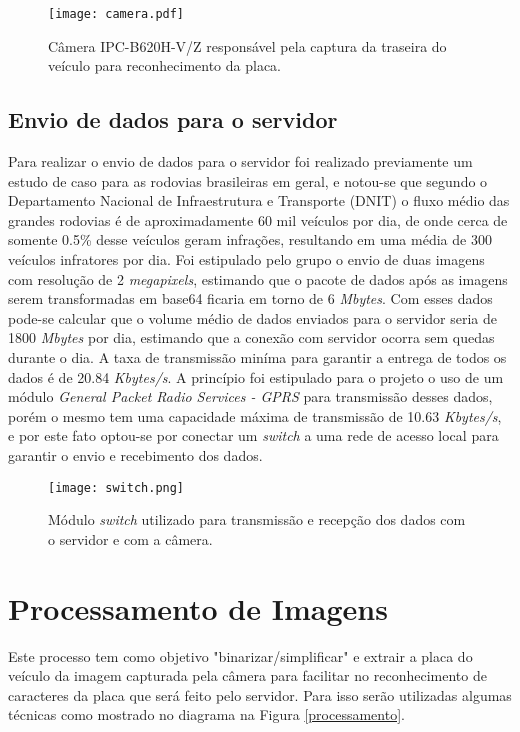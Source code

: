    \begin{figure}[H]
    \centering
    \texttt{[image: camera.pdf]}
    \caption{Câmera IPC-B620H-V/Z responsável pela captura da traseira do veículo para reconhecimento da placa.}
    \label{camera}
\end{figure}

    
    \subsection{Envio de dados para o servidor}
    Para realizar o envio de dados para o servidor foi realizado previamente um estudo de caso para as rodovias brasileiras em geral, e notou-se que segundo o Departamento Nacional de Infraestrutura e Transporte (DNIT) o fluxo médio das grandes rodovias é de aproximadamente 60 mil veículos por dia, de onde cerca de somente 0.5\% desse veículos geram infrações, resultando em uma média de 300 veículos infratores por dia. Foi estipulado pelo grupo o envio de duas imagens com resolução de 2 \emph{megapixels}, estimando que o pacote de dados após as imagens serem transformadas em base64 ficaria em torno de 6 \emph{Mbytes}. Com esses dados pode-se calcular que o volume médio de dados enviados para o servidor seria de 1800 \emph{Mbytes} por dia, estimando que a conexão com servidor ocorra sem quedas durante o dia. A taxa de transmissão miníma para garantir a entrega de todos os dados é de 20.84 \emph{Kbytes/s}. A princípio foi estipulado para o projeto o uso de um módulo \emph{General Packet Radio Services - GPRS} para transmissão desses dados, porém o mesmo tem uma capacidade máxima de transmissão de 10.63 \emph{Kbytes/s}, e por este fato optou-se por conectar um \emph{switch} a uma rede de acesso local para garantir o envio e recebimento dos dados. 
        \begin{figure}[H]
            \centering
            \texttt{[image: switch.png]}
            \caption{Módulo \emph{switch} utilizado para transmissão e recepção dos dados com o servidor e com a câmera.}
            \label{switch}
        \end{figure}

\section{Processamento de Imagens}

Este processo tem como objetivo "binarizar/simplificar" e extrair a placa do veículo da imagem capturada pela câmera para facilitar no reconhecimento de caracteres da placa que será feito pelo servidor. Para isso serão utilizadas algumas técnicas como mostrado no diagrama na Figura \ref{processamento}.

